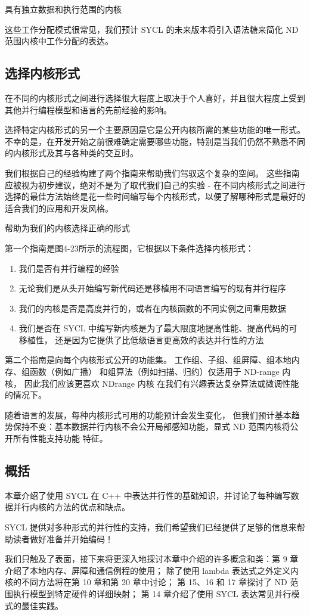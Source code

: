 {\color{red} 具有独立数据和执行范围的内核}

这些工作分配模式很常见，我们预计 SYCL 的未来版本将引入语法糖来简化 ND 范围内核中工作分配的表达。

\subsection{选择内核形式}
在不同的内核形式之间进行选择很大程度上取决于个人喜好，并且很大程度上受到其他并行编程模型和语言的先前经验的影响。

选择特定内核形式的另一个主要原因是它是公开内核所需的某些功能的唯一形式。 
不幸的是，在开发开始之前很难确定需要哪些功能，特别是当我们仍然不熟悉不同的内核形式及其与各种类的交互时。

我们根据自己的经验构建了两个指南来帮助我们驾驭这个复杂的空间。 
这些指南应被视为初步建议，绝对不是为了取代我们自己的实验 - 
在不同内核形式之间进行选择的最佳方法始终是花一些时间编写每个内核形式，以便了解哪种形式是最好的 适合我们的应用和开发风格。

{\color{red} 帮助为我们的内核选择正确的形式}

第一个指南是图4-23所示的流程图，它根据以下条件选择内核形式：

\begin{enumerate}
	\item 我们是否有并行编程的经验

	\item 无论我们是从头开始编写新代码还是移植用不同语言编写的现有并行程序

	\item 我们的内核是否是高度并行的，或者在内核函数的不同实例之间重用数据

	\item 我们是否在 SYCL 中编写新内核是为了最大限度地提高性能、提高代码的可移植性，
	还是因为它提供了比低级语言更高效的表达并行性的方法
\end{enumerate}

第二个指南是向每个内核形式公开的功能集。 工作组、子组、组屏障、组本地内存、组函数（例如广播）
和组算法（例如扫描、归约）仅适用于 ND-range 内核，
因此我们应该更喜欢 NDrange 内核 在我们有兴趣表达复杂算法或微调性能的情况下。

随着语言的发展，每种内核形式可用的功能预计会发生变化，
但我们预计基本趋势保持不变：基本数据并行内核不会公开局部感知功能，显式 ND 范围内核将公开所有性能支持功能 特征。

\subsection{概括}
本章介绍了使用 SYCL 在 C++ 中表达并行性的基础知识，并讨论了每种编写数据并行内核的方法的优点和缺点。

SYCL 提供对多种形式的并行性的支持，我们希望我们已经提供了足够的信息来帮助读者做好准备并开始编码！

我们只触及了表面，接下来将更深入地探讨本章中介绍的许多概念和类：第 9 章介绍了本地内存、屏障和通信例程的使用； 
除了使用 lambda 表达式之外定义内核的不同方法将在第 10 章和第 20 章中讨论； 
第 15、16 和 17 章探讨了 ND 范围执行模型到特定硬件的详细映射； 
第 14 章介绍了使用 SYCL 表达常见并行模式的最佳实践。
